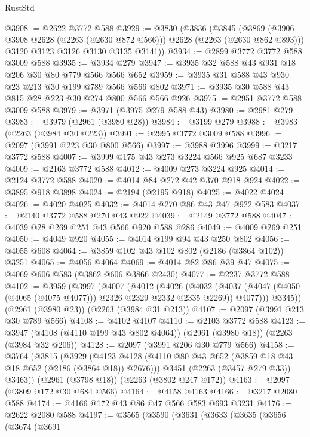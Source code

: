 \begin{lexlean}{RustStd}
\begin{coremodule}
@3908 := @2622 @3772 @588
@3929 := @3830
    (@3836
      (@3845
        (@3869 (@3906 @3908 @2628 (@2263 (@2630 @872 @566))) @2628 (@2263 (@2630 @862 @893)))
        @3120
        @3123
        @3126
        @3130
        @3135
        @3141))
@3934 := @2899 @3772 @3772 @588 @3009 @588
@3935 := @3934 @279
@3947 := @3935 @32 @588 @43 @931 @18 @206 @30 @80 @779 @566 @566 @652
@3959 := @3935 @31 @588 @43 @930 @23 @213 @30 @199 @789 @566 @566 @802
@3971 := @3935 @30 @588 @43 @815 @28 @223 @30 @274 @800 @566 @566 @926
@3975 := @2951 @3772 @588 @3009 @588
@3979 := @3971 (@3975 @279 @588 @43)
@3980 := @2981 @279
@3983 := @3979 (@2961 (@3980 @28))
@3984 := @3199 @279
@3988 := @3983 (@2263 (@3984 @30 @223))
@3991 := @2995 @3772 @3009 @588
@3996 := @2097 (@3991 @223 @30 @800 @566)
@3997 := @3988 @3996
@3999 := @3217 @3772 @588
@4007 := @3999 @175 @43 @273 @3224 @566 @925 @687 @3233
@4009 := @2163 @3772 @588
@4012 := @4009 @273 @3224 @925
@4014 := @2124 @3772 @588
@4020 := @4014 @84 @272 @42 @370 @918 @924
@4022 := @3895 @918 @3898
@4024 := @2194 (@2195 @918)
@4025 := @4022 @4024
@4026 := @4020 @4025
@4032 := @4014 @270 @86 @43 @47 @922 @583
@4037 := @2140 @3772 @588 @270 @43 @922
@4039 := @2149 @3772 @588
@4047 := @4039 @28 @269 @251 @43 @566 @920 @588 @286
@4049 := @4009 @269 @251
@4050 := @4049 @920
@4055 := @4014 @199 @94 @43 @250 @802
@4056 := @4055 @608
@4064 := @3859 @102 @43 @102 @802 (@2186 (@3864 @102)) @3251
@4065 := @4056 @4064
@4069 := @4014 @82 @86 @39 @47
@4075 := @4069 @606 @583 (@3862 @606 @3866 @2430)
@4077 := @2237 @3772 @588
@4102 := @3959
    (@3997
      (@4007
        (@4012
          (@4026
            (@4032
              (@4037 (@4047 (@4050 (@4065 (@4075 @4077))) @2326 @2329 @2332 @2335 @2269))
              @4077)))
        @3345))
    (@2961 (@3980 @23))
    (@2263 (@3984 @31 @213))
@4107 := @2097 (@3991 @213 @30 @789 @566)
@4108 := @4102 @4107
@4110 := @2103 @3772 @588
@4123 := @3947 (@4108 (@4110 @199 @43 @802 @4064)) (@2961 (@3980 @18)) (@2263 (@3984 @32 @206))
@4128 := @2097 (@3991 @206 @30 @779 @566)
@4158 := @3764
    (@3815
      (@3929
        (@4123 @4128 (@4110 @80 @43 @652 (@3859 @18 @43 @18 @652 (@2186 (@3864 @18)) @2676)))
        @3451
        (@2263 (@3457 @279 @33))
        @3463))
    (@2961 (@3798 @18))
    (@2263 (@3802 @247 @172))
@4163 := @2097 (@3809 @172 @30 @684 @566)
@4164 := @4158 @4163
@4166 := @3217 @2080 @588
@4174 := @4166 @172 @43 @86 @47 @566 @583 @693 @3231
@4176 := @2622 @2080 @588
@4197 := @3565
    (@3590
      (@3631
        (@3633
          (@3635
            (@3656
              (@3674
                (@3691

\end{coremodule}
\end{lexlean}
